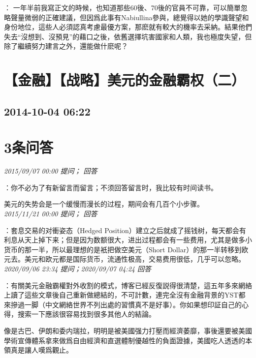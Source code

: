 \documentclass[twocolumn]{ctexart}
\begin{document}
：
一年半前我寫正文的時候，也知道那些60後、70後的官員不可靠，可以簡單忽略聲量微弱的正確建議，但因爲此事有Nabiullina參與，總覺得以她的學識聲望和身份地位，這些人必須認真考慮最優方案，那麽就有較大的機率去采納。結果他們失去“沒想到、沒預見”的藉口之後，依舊選擇坑害國家和人類，我也極度失望，但除了繼續努力建言之外，還能做什麽呢？
\\


\section{【金融】【战略】美元的金融霸权（二）}
\subsection{2014-10-04 06:22}


\section{3条问答}

\textit{\hfill\noindent\small 2015/09/07 00:00 提问； 回答}

：你不必为了有新留言而留言；不须回答留言时，我比较有时间读书。

美元的失势会是一个缓慢而漫长的过程，期间会有几百个小步骤。\\

\textit{\hfill\noindent\small 2015/11/21 00:00 提问； 回答}

：套息交易的对衝姿态（Hedged Position）建立之后就成了摇钱树，每天都会有利息从天上掉下来；但是因为数额很大，进出过程都会有一些费用，尤其是做多小货币的那一半，所以最理想的是衹把做空美元（Short Dollar）的那一半转移到欧元去。美元和欧元都是国际货币，流通性极高，交易费用很低，几乎可以忽略。\\

\textit{\hfill\noindent\small 2020/09/06 23:34 提问；2020/09/07 04:24 回答}

：有關美元金融霸權對外收割的模式，博客已經反復説得很清楚，這五年多來網絡上讀了這些文章後自己重新做總結的，不可計數，連完全沒有金融背景的YST都來摻過一脚（中文網絡世界不列出處的習慣真不是好事）。你如果想印証自己的心得，搜索一下應該很容易找到很多其他人的結論。

像是古巴、伊朗和委内瑞拉，明明是被美國强力打壓而經濟萎靡，事後還要被美國學術宣傳體系拿來做爲自由經濟和直選體制優越性的負面證據，美國吃人透透的本領真是讓人嘆爲觀止。
\\
\end{document}
